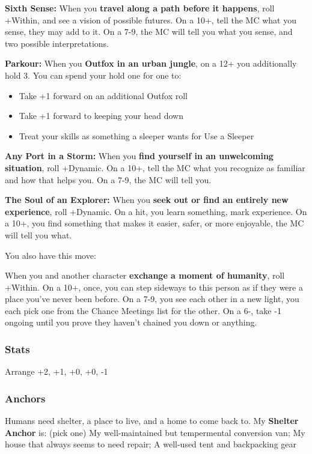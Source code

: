 \documentclass[
]{article}
\providecommand{\tightlist}{%
  \setlength{\itemsep}{0pt}\setlength{\parskip}{0pt}}
\begin{document}
\textbf{Sixth Sense:} When you \textbf{travel along a path before it
happens}, roll +Within, and see a vision of possible futures. On a 10+,
tell the MC what you sense, they may add to it. On a 7-9, the MC will
tell you what you sense, and two possible interpretations.

\textbf{Parkour:} When you \textbf{Outfox in an urban jungle}, on a 12+
you additionally hold 3. You can spend your hold one for one to:

\begin{itemize}
\tightlist
\item
  Take +1 forward on an additional Outfox roll
\item
  Take +1 forward to keeping your head down
\item
  Treat your skills as something a sleeper wants for Use a Sleeper
\end{itemize}

\textbf{Any Port in a Storm:} When you \textbf{find yourself in an
unwelcoming situation}, roll +Dynamic. On a 10+, tell the MC what you
recognize as familiar and how that helps you. On a 7-9, the MC will tell
you.

\textbf{The Soul of an Explorer:} When you \textbf{seek out or find an
entirely new experience}, roll +Dynamic. On a hit, you learn something,
mark experience. On a 10+, you find something that makes it easier,
safer, or more enjoyable, the MC will tell you what.

You also have this move:

When you and another character \textbf{exchange a moment of humanity},
roll +Within. On a 10+, once, you can step sideways to this person as if
they were a place you've never been before. On a 7-9, you see each other
in a new light, you each pick one from the Chance Meetings list for the
other. On a 6-, take -1 ongoing until you prove they haven't chained you
down or anything.

\hypertarget{stats-9}{%
\subsubsection{Stats}\label{stats-9}}

Arrange +2, +1, +0, +0, -1

\hypertarget{anchors-8}{%
\subsubsection{Anchors}\label{anchors-8}}

Humans need shelter, a place to live, and a home to come back to. My
\textbf{Shelter Anchor} is: (pick one) My well-maintained but
tempermental conversion van; My house that always seems to need repair;
A well-used tent and backpacking gear
\end{document}
